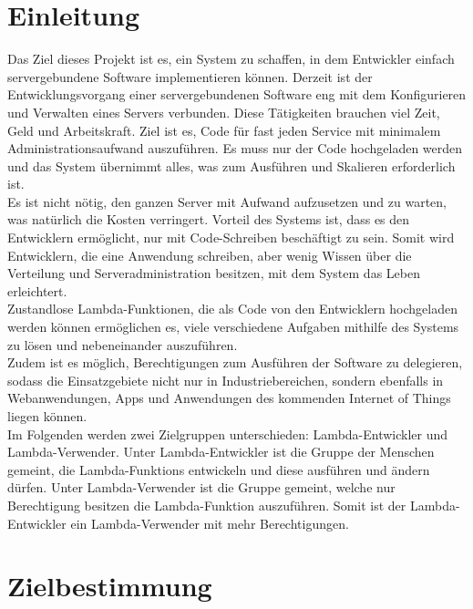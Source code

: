 \documentclass[a4paper,20pt,oneside]{book}
\begin{document}
\chapter{Einleitung}
Das Ziel dieses Projekt ist es, ein System zu schaffen, in dem  Entwickler einfach servergebundene Software implementieren können. Derzeit ist der Entwicklungsvorgang einer servergebundenen Software eng mit dem Konfigurieren und Verwalten eines Servers verbunden. Diese Tätigkeiten brauchen viel Zeit, Geld und Arbeitskraft. Ziel ist es, Code für fast jeden Service mit minimalem Administrationsaufwand auszuführen. Es muss nur der Code hochgeladen werden und das System übernimmt alles, was zum Ausführen und Skalieren erforderlich ist. 
\\
Es ist nicht nötig, den ganzen Server mit Aufwand aufzusetzen und zu warten, was natürlich die Kosten verringert. Vorteil des Systems ist, dass es den Entwicklern ermöglicht, nur mit Code-Schreiben beschäftigt zu sein. 
Somit wird Entwicklern, die eine Anwendung schreiben, aber wenig Wissen über die Verteilung und Serveradministration besitzen, mit dem System das Leben erleichtert. 
\\
Zustandlose Lambda-Funktionen, die als Code von den Entwicklern hochgeladen werden können ermöglichen es, viele verschiedene Aufgaben mithilfe des Systems zu lösen und nebeneinander auszuführen.
\\
Zudem ist es möglich, Berechtigungen zum Ausführen der Software zu delegieren, sodass die Einsatzgebiete nicht nur in Industriebereichen, sondern ebenfalls in Webanwendungen, Apps und Anwendungen des kommenden Internet of Things liegen können.
\\
Im Folgenden werden zwei Zielgruppen unterschieden: \gls{Lambda-Entwickler} und \gls{Lambda-Verwender}. Unter \gls{Lambda-Entwickler} ist die Gruppe der Menschen gemeint, die \Glspl{Lambda-Funktion} entwickeln und diese ausführen und ändern dürfen. Unter \gls{Lambda-Verwender} ist die Gruppe gemeint, welche nur Berechtigung besitzen die \Gls{Lambda-Funktion} auszuführen. Somit ist der \gls{Lambda-Entwickler} ein \gls{Lambda-Verwender} mit mehr Berechtigungen.


 
\chapter{Zielbestimmung}
\end{document}

